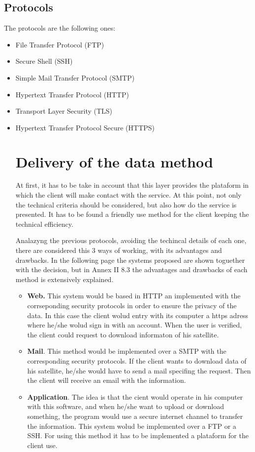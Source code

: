 \subsection{Protocols}
The protocols are the following ones:
\begin{itemize}
\item File Transfer Protocol (FTP)
\item Secure Shell (SSH)
\item Simple Mail Transfer Protocol (SMTP)
\item Hypertext Transfer Protocol (HTTP)
\item Transport Layer Security (TLS)
\item Hypertext Transfer Protocol Secure (HTTPS) 
\section{Delivery of the data method} 
At first, it has to be take in account that this layer provides the plataform in which the client will make contact with the service. At this point, not only the technical criteria should be considered, but also how do the service is presented. It has to be found a friendly use method for the client keeping the technical efficiency.

Analazyng the previous protocols, avoiding the techincal details of each one, there are considered this 3 ways of working, with its advantages and drawbacks. In the following page the systems proposed are shown toguether with the decision, but in Annex II 8.3 the advantages and drawbacks of each method is extensively explained.
\begin{itemize}
\item \textbf{Web.} This system would be based in HTTP an implemented with the corrseponding security protocols in order to ensure the privacy of the data. In this case the client wolud entry with its computer a https adress where he/she wolud sign in with an account. When the user is verified, the client could request to download informaton of his satellite. 
\item \textbf{Mail}. This method would be implemented over a SMTP with the corresponding security protocols. If the client wants to download data of his satellite, he/she would have to send a mail specifing the request. Then the client will receive an email with the information.
\item \textbf{Application}.  The idea is that the cient would operate in his computer with this software, and when he/she want to upload or download something, the program would use a secure internet channel to transfer the information. This system wolud be implemented over a FTP or a SSH. For using this method it has to be implemented a plataform for the client use.
\end{itemize}


\end{itemize}
